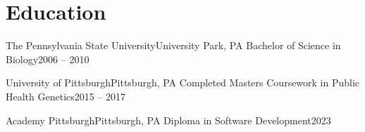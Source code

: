 \section{Education}
\resumeSubHeadingListStart
  \resumeSubheading
    {The Pennsylvania State University}{University Park, PA}
    {Bachelor of Science in Biology}{2006 -- 2010}

  \resumeSubheading
    {University of Pittsburgh}{Pittsburgh, PA}
    {Completed Masters Coursework in Public Health Genetics}{2015 -- 2017}

  \resumeSubheading
    {Academy Pittsburgh}{Pittsburgh, PA}
    {Diploma in Software Development}{2023}
\resumeSubHeadingListEnd